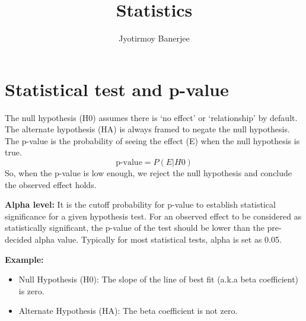 \documentclass{article}
\title{Statistics}
\author{Jyotirmoy Banerjee}
\begin{document}
\maketitle

\section{Statistical test and p-value}
The null hypothesis (H0) assumes there is `no effect' or `relationship' by default. The alternate hypothesis (HA) is always framed to negate the null hypothesis. The p-value is the probability of seeing the effect (E) when the null hypothesis is true.
\[
\text{p-value} = P(E|H0)
\]
So, when the p-value is low enough, we reject the null hypothesis and conclude the observed effect holds.

\textbf{Alpha level:}
It is the cutoff probability for p-value to establish statistical significance for a given hypothesis test.
For an observed effect to be considered as statistically significant, the p-value of the test should be lower than the pre-decided alpha value.
Typically for most statistical tests, alpha is set as 0.05.

\textbf{Example:}
\begin{itemize}
\itemsep0em
\item Null Hypothesis (H0): The slope of the line of best fit (a.k.a beta coefficient) is zero.
\item Alternate Hypothesis (HA): The beta coefficient is not zero.
\end{itemize}
\end{document}
